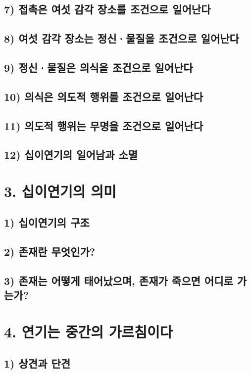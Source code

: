 \documentclass[12pt, a4paper, oneside]{book}
\begin{document}
	\section{7) 접촉은 여섯 감각 장소를 조건으로 일어난다}
	\section{8) 여섯 감각 장소는 정신·물질을 조건으로 일어난다}
	\section{9) 정신·물질은 의식을 조건으로 일어난다}
	\section{10) 의식은 의도적 행위를 조건으로 일어난다}
	\section{11) 의도적 행위는 무명을 조건으로 일어난다}
	\section{12) 십이연기의 일어남과 소멸}

	\newpage
	\chapter{3. 십이연기의 의미}
	\section{1) 십이연기의 구조}
	\section{2) 존재란 무엇인가?}
	\section{3) 존재는 어떻게 태어났으며, 존재가 죽으면 어디로 가는가?}

	\newpage
	\chapter{4. 연기는 중간의 가르침이다}
	\section{1) 상견과 단견}
\end{document}
